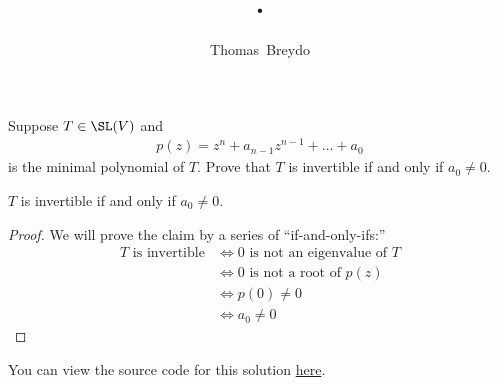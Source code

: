 \documentclass{amsart}
\title{\pagenum.\probnum}
\author{Thomas\ Breydo}
\newcommand{\pagenum}{268}
\newcommand{\probnum}{8}
\begin{document}
\maketitle

\begin{problem*}
Suppose $T\in\SL(V)$ and
\begin{align*}
    p(z)=z^n + a_{n-1}z^{n-1} + \dots + a_0
\end{align*}
is the minimal polynomial of $T.$ Prove that $T$ is invertible if and
only if $a_0\ne 0.$
\end{problem*}

\vspace{0.5in}

\begin{claim*}
    $T$ is invertible if and only if $a_0\ne 0$.
\end{claim*}
\begin{proof}
We will prove the claim by a series of ``if-and-only-ifs:''
\begin{align*}
    T\text{ is invertible}
    &\Longleftrightarrow
    0\text{ is not an eigenvalue of }T \\
    &\Longleftrightarrow
    0\text{ is not a root of }p(z) \\
    &\Longleftrightarrow
    p(0)\ne 0 \\
    &\Longleftrightarrow
    a_0\ne 0
\end{align*}
\end{proof}

\vspace{0.5in}

\begin{note*}
You can view the source code for this solution
\href{https://github.com/thomasbreydo/linalg/blob/main/\pagenum_\probnum_Thomas_Breydo.tex}
{here}.
\end{note*}
\end{document}
